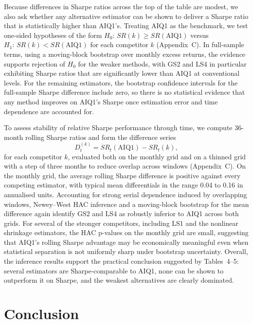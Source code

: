 \documentclass[12pt,letterpaper]{article}
\begin{document}
Because differences in Sharpe ratios across the top of the table are modest, we also ask whether any alternative estimator can be shown to deliver a Sharpe ratio that is statistically higher than AIQ1's. Treating AIQ1 as the benchmark, we test one-sided hypotheses of the form $H_0:\, SR(k)\ge SR(\mathrm{AIQ1})$ versus $H_1:\, SR(k)<SR(\mathrm{AIQ1})$ for each competitor $k$ (Appendix~C). In full-sample terms, using a moving-block bootstrap over monthly excess returns, the evidence supports rejection of $H_0$ for the weaker methods, with GS2 and LS4 in particular exhibiting Sharpe ratios that are significantly lower than AIQ1 at conventional levels. For the remaining estimators, the bootstrap confidence intervals for the full-sample Sharpe difference include zero, so there is no statistical evidence that any method improves on AIQ1's Sharpe once estimation error and time dependence are accounted for.

To assess stability of relative Sharpe performance through time, we compute 36-month rolling Sharpe ratios and form the difference series
\[
D^{(k)}_t = SR_t(\mathrm{AIQ1}) - SR_t(k),
\]
for each competitor $k$, evaluated both on the monthly grid and on a thinned grid with a step of three months to reduce overlap across windows (Appendix~C). On the monthly grid, the average rolling Sharpe difference is positive against every competing estimator, with typical mean differentials in the range 0.04 to 0.16 in annualised units. Accounting for strong serial dependence induced by overlapping windows, Newey--West HAC inference and a moving-block bootstrap for the mean difference again identify GS2 and LS4 as robustly inferior to AIQ1 across both grids. For several of the stronger competitors, including LS1 and the nonlinear shrinkage estimators, the HAC p-values on the monthly grid are small, suggesting that AIQ1's rolling Sharpe advantage may be economically meaningful even when statistical separation is not uniformly sharp under bootstrap uncertainty. Overall, the inference results support the practical conclusion suggested by Tables~4--5: several estimators are Sharpe-comparable to AIQ1, none can be shown to outperform it on Sharpe, and the weakest alternatives are clearly dominated.

\section{Conclusion}
\end{document}
